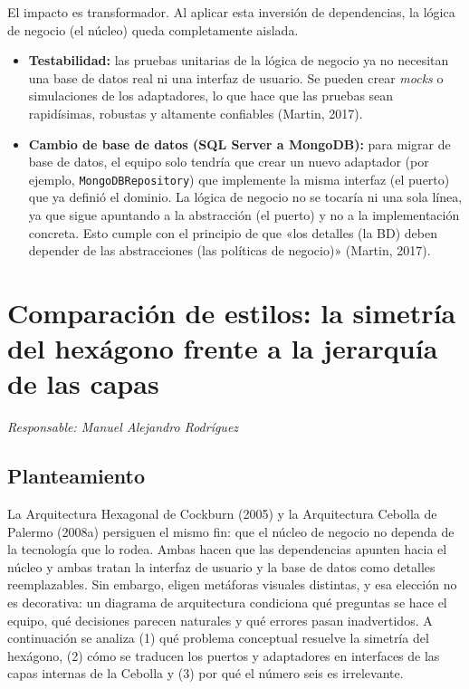 \documentclass[11pt,a4paper]{article}
\newcommand{\responsable}[1]{\noindent\textit{Responsable: #1}\par\medskip}
\begin{document}
El impacto es transformador. Al aplicar esta inversión de dependencias, la lógica de negocio
(el núcleo) queda completamente aislada.

\begin{itemize}[leftmargin=1.4em]
\item \textbf{Testabilidad:} las pruebas unitarias de la lógica de negocio ya no necesitan una
base de datos real ni una interfaz de usuario. Se pueden crear \emph{mocks} o simulaciones de
los adaptadores, lo que hace que las pruebas sean rapidísimas, robustas y altamente confiables
(Martin, 2017).
\item \textbf{Cambio de base de datos (SQL Server a MongoDB):} para migrar de base de datos, el
equipo solo tendría que crear un nuevo adaptador (por ejemplo, \texttt{MongoDBRepository}) que
implemente la misma interfaz (el puerto) que ya definió el dominio. La lógica de negocio no se
tocaría ni una sola línea, ya que sigue apuntando a la abstracción (el puerto) y no a la
implementación concreta. Esto cumple con el principio de que «los detalles (la BD) deben
depender de las abstracciones (las políticas de negocio)» (Martin, 2017).
\end{itemize}

\newpage
\section{Comparación de estilos: la simetría del hexágono frente a la jerarquía de las capas}
\responsable{Manuel Alejandro Rodríguez}

\subsection*{Planteamiento}

La Arquitectura Hexagonal de Cockburn (2005) y la Arquitectura Cebolla de Palermo (2008a)
persiguen el mismo fin: que el núcleo de negocio no dependa de la tecnología que lo rodea.
Ambas hacen que las dependencias apunten hacia el núcleo y ambas tratan la interfaz de
usuario y la base de datos como detalles reemplazables. Sin embargo, eligen metáforas
visuales distintas, y esa elección no es decorativa: un diagrama de arquitectura condiciona
qué preguntas se hace el equipo, qué decisiones parecen naturales y qué errores pasan
inadvertidos. A continuación se analiza (1) qué problema conceptual resuelve la simetría del
hexágono, (2) cómo se traducen los puertos y adaptadores en interfaces de las capas internas
de la Cebolla y (3) por qué el número seis es irrelevante.
\end{document}
